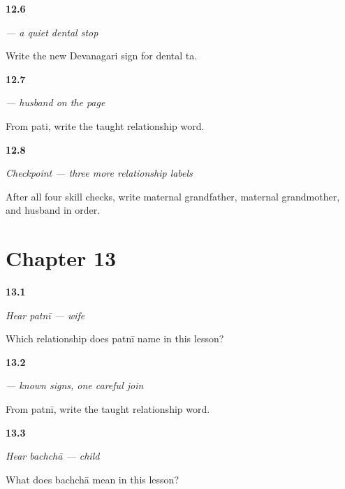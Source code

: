 \noindent\begin{minipage}[t]{\linewidth}
\raggedright
\hypertarget{review-MW-W09-ta-write}{\textbf{12.6}} \emph{ — a quiet dental stop}\par
\small Write the new Devanagari sign for dental ta.
\end{minipage}\par\medskip

\noindent\begin{minipage}[t]{\linewidth}
\raggedright
\hypertarget{review-MW-C09-pati-dictation}{\textbf{12.7}} \emph{ — husband on the page}\par
\small From pati, write the taught relationship word.
\end{minipage}\par\medskip

\noindent\begin{minipage}[t]{\linewidth}
\raggedright
\hypertarget{review-MW-R09-maternal-three-payoff}{\textbf{12.8}} \emph{Checkpoint — three more relationship labels}\par
\small After all four skill checks, write maternal grandfather, maternal grandmother, and husband in order.
\end{minipage}\par\medskip

\section*{Chapter 13}

\noindent\begin{minipage}[t]{\linewidth}
\raggedright
\hypertarget{review-MW-C09-hear-patni-meaning}{\textbf{13.1}} \emph{Hear \emph{patnī} — wife}\par
\small Which relationship does patnī name in this lesson?
\end{minipage}\par\medskip

\noindent\begin{minipage}[t]{\linewidth}
\raggedright
\hypertarget{review-MW-C09-patni-dictation}{\textbf{13.2}} \emph{ — known signs, one careful join}\par
\small From patnī, write the taught relationship word.
\end{minipage}\par\medskip

\noindent\begin{minipage}[t]{\linewidth}
\raggedright
\hypertarget{review-MW-C09-hear-bachcha-meaning}{\textbf{13.3}} \emph{Hear \emph{bachchā} — child}\par
\small What does bachchā mean in this lesson?
\end{minipage}\par\medskip

